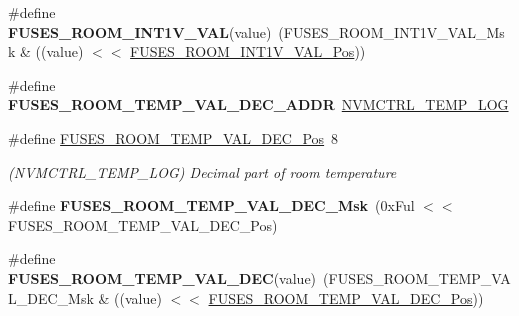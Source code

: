 \begin{DoxyCompactItemize}
\item 
\hypertarget{group__fuses__api_ga2b3c66271da44cfbcc49e3c0e0bbc9df}{}\#define {\bfseries F\+U\+S\+E\+S\+\_\+\+R\+O\+O\+M\+\_\+\+I\+N\+T1\+V\+\_\+\+V\+A\+L}(value)~(F\+U\+S\+E\+S\+\_\+\+R\+O\+O\+M\+\_\+\+I\+N\+T1\+V\+\_\+\+V\+A\+L\+\_\+\+Msk \& ((value) $<$$<$ \hyperlink{group__fuses__api_gaac3dee19f6ada7e3e76edabd527b521d}{F\+U\+S\+E\+S\+\_\+\+R\+O\+O\+M\+\_\+\+I\+N\+T1\+V\+\_\+\+V\+A\+L\+\_\+\+Pos}))\label{group__fuses__api_ga2b3c66271da44cfbcc49e3c0e0bbc9df}

\item 
\hypertarget{group__fuses__api_gafbcf8dd0b4be710381b85019a2b6f21e}{}\#define {\bfseries F\+U\+S\+E\+S\+\_\+\+R\+O\+O\+M\+\_\+\+T\+E\+M\+P\+\_\+\+V\+A\+L\+\_\+\+D\+E\+C\+\_\+\+A\+D\+D\+R}~\hyperlink{group___s_a_m_l21_j18_a__base_gae900d443ec6d7cf1c90d21b6662fa447}{N\+V\+M\+C\+T\+R\+L\+\_\+\+T\+E\+M\+P\+\_\+\+L\+O\+G}\label{group__fuses__api_gafbcf8dd0b4be710381b85019a2b6f21e}

\item 
\hypertarget{group__fuses__api_gaac2a02c5ab8d7fd6e6be94f6657558a6}{}\#define \hyperlink{group__fuses__api_gaac2a02c5ab8d7fd6e6be94f6657558a6}{F\+U\+S\+E\+S\+\_\+\+R\+O\+O\+M\+\_\+\+T\+E\+M\+P\+\_\+\+V\+A\+L\+\_\+\+D\+E\+C\+\_\+\+Pos}~8\label{group__fuses__api_gaac2a02c5ab8d7fd6e6be94f6657558a6}

\begin{DoxyCompactList}\small\item\em (N\+V\+M\+C\+T\+R\+L\+\_\+\+T\+E\+M\+P\+\_\+\+L\+O\+G) Decimal part of room temperature \end{DoxyCompactList}\item 
\hypertarget{group__fuses__api_gaace1130bb063f9870470ccb729f1def6}{}\#define {\bfseries F\+U\+S\+E\+S\+\_\+\+R\+O\+O\+M\+\_\+\+T\+E\+M\+P\+\_\+\+V\+A\+L\+\_\+\+D\+E\+C\+\_\+\+Msk}~(0x\+Ful $<$$<$ F\+U\+S\+E\+S\+\_\+\+R\+O\+O\+M\+\_\+\+T\+E\+M\+P\+\_\+\+V\+A\+L\+\_\+\+D\+E\+C\+\_\+\+Pos)\label{group__fuses__api_gaace1130bb063f9870470ccb729f1def6}

\item 
\hypertarget{group__fuses__api_ga6c48919f5a1093a0a58dcc7b5e2bdaff}{}\#define {\bfseries F\+U\+S\+E\+S\+\_\+\+R\+O\+O\+M\+\_\+\+T\+E\+M\+P\+\_\+\+V\+A\+L\+\_\+\+D\+E\+C}(value)~(F\+U\+S\+E\+S\+\_\+\+R\+O\+O\+M\+\_\+\+T\+E\+M\+P\+\_\+\+V\+A\+L\+\_\+\+D\+E\+C\+\_\+\+Msk \& ((value) $<$$<$ \hyperlink{group__fuses__api_gaac2a02c5ab8d7fd6e6be94f6657558a6}{F\+U\+S\+E\+S\+\_\+\+R\+O\+O\+M\+\_\+\+T\+E\+M\+P\+\_\+\+V\+A\+L\+\_\+\+D\+E\+C\+\_\+\+Pos}))\label{group__fuses__api_ga6c48919f5a1093a0a58dcc7b5e2bdaff}


\end{DoxyCompactItemize}
